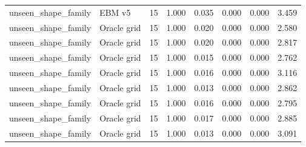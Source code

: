 {\begin{longtable}{llrrrrrr}
unseen\_shape\_family & EBM v5 & 15 & 1.000 & 0.035 & 0.000 & 0.000 & 3.459 \\
unseen\_shape\_family & Oracle grid & 15 & 1.000 & 0.020 & 0.000 & 0.000 & 2.580 \\
unseen\_shape\_family & Oracle grid & 15 & 1.000 & 0.020 & 0.000 & 0.000 & 2.817 \\
unseen\_shape\_family & Oracle grid & 15 & 1.000 & 0.015 & 0.000 & 0.000 & 2.762 \\
unseen\_shape\_family & Oracle grid & 15 & 1.000 & 0.016 & 0.000 & 0.000 & 3.116 \\
unseen\_shape\_family & Oracle grid & 15 & 1.000 & 0.013 & 0.000 & 0.000 & 2.862 \\
unseen\_shape\_family & Oracle grid & 15 & 1.000 & 0.016 & 0.000 & 0.000 & 2.795 \\
unseen\_shape\_family & Oracle grid & 15 & 1.000 & 0.017 & 0.000 & 0.000 & 2.885 \\
unseen\_shape\_family & Oracle grid & 15 & 1.000 & 0.013 & 0.000 & 0.000 & 3.091 \\
\bottomrule
\end{longtable}
}
